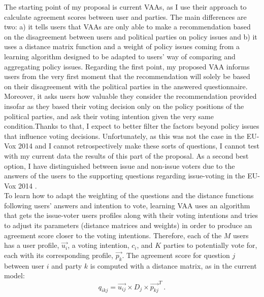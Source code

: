 \documentclass{scrartcl}
\begin{document}
The starting point of my proposal is current VAAs, as I use their approach to calculate agreement scores between user and parties. The main differences are two: a) it tells users that VAAs are only able to make a recommendation based on the disagreement between users and political parties on policy issues and b) it uses a distance matrix function and a weight of policy issues coming from a learning algorithm designed to be adapted to users' way of comparing and aggregating policy issues. Regarding the first point, my proposed VAA informs users from the very first moment that the recommendation will solely be based on their disagreement with the political parties in the answered questionnaire. Moreover, it asks users how valuable they consider the recommendation provided insofar as they based their voting decision only on the policy positions of the political parties, and ask their voting intention given the very same condition.Thanks to that, I expect to better filter the factors beyond policy issues that influence voting decisions. Unfortunately, as this was not the case in the EU-Vox 2014 and I cannot retrospectively make these sorts of questions, I cannot test with my current data the results of this part of the proposal. As a second best option, I have distinguished between issue and non-issue voters due to the answers of the users to the supporting questions regarding issue-voting in the EU-Vox 2014 \cite{Mendez2017}.
\\

To learn how to adapt the weighting of the questions and the distance functions following users' answers and intention to vote, learning VAA uses an algorithm that gets the issue-voter users profiles along with their voting intentions and tries to adjust its parameters (distance matrices and weights) in order to produce an agreement score closer to the voting intentions. Therefore, each  of the $M$ users has a user profile, $\Vec{u_i}$, a voting intention, $c_i$, and $K$ parties to potentially vote for, each with its corresponding profile, $\Vec{p_k}$. The agreement score for question $j$ between user $i$ and party $k$ is computed with a distance matrix, as in the current model:
\begin{equation}
    q_{ikj} = \Vec{u_{ij}} \times D_j \times \Vec{p_{kj}}^T \: .
\end{equation}
\end{document}
